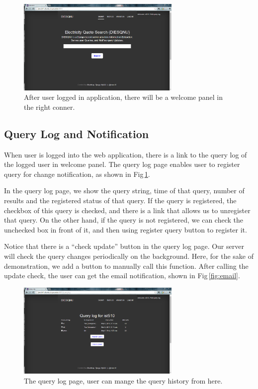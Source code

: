 \documentclass{article}
\begin{document}
\begin{figure}[h]
\centering
\includegraphics[width=0.7\textwidth]{fig/loggedin.PNG}
\caption{After user logged in application, there will be a welcome panel in the right conner.}
\end{figure}


\subsection{Query Log and Notification}

When user is logged into the web application, there is a link to the query log of the logged user in welcome panel. The query log page enables user to register query for change notification, as shown in Fig\,\ref{fig:not}.

In the query log page, we show the query string, time of that query, number of results and the registered status of that query. If the query is registered, the checkbox of this query is checked, and there is a link that allows us to unregister that query. On the other hand, if the query is not registered, we can check the unchecked box in front of it, and then using register query button to register it.

Notice that there is a ``check update'' button in the query log page. Our server will check the query changes periodically on the background. Here, for the sake of demonstration, we add a button to manually call this function. After calling the update check, the user can get the email notification, shown in Fig\,\ref{fig:email}.

\begin{figure}[h]
\centering
\includegraphics[width=0.7\textwidth]{fig/querylog.PNG}
\caption{The query log page, user can mange the query history from here.}
\label{fig:not}
\end{figure}
\end{document}
